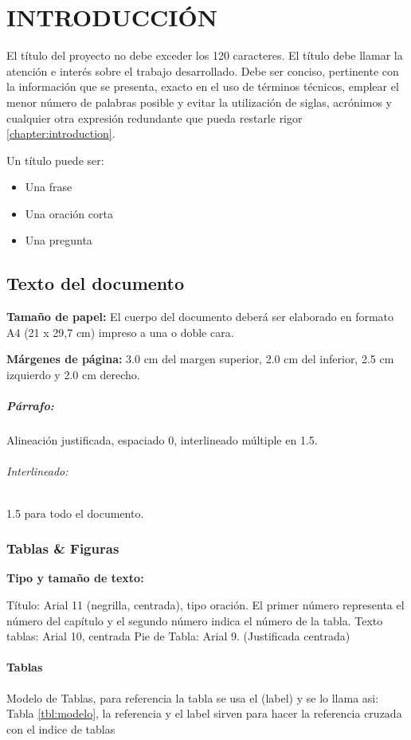 \chapter{INTRODUCCI\'ON}
\thispagestyle{empty}
\label{chapter:introduction}

El título del proyecto no debe exceder los 120 caracteres.
El título debe llamar la atención e interés sobre el trabajo desarrollado. Debe ser conciso, pertinente con la información que se presenta, exacto en el uso de términos técnicos, emplear el menor número de palabras posible y evitar la utilización de siglas, acrónimos y cualquier otra expresión redundante que pueda restarle rigor \ref{chapter:introduction}. 

Un título puede ser:
\begin{itemize}
    \item Una frase
    \item Una oración corta 
    \item Una pregunta 
\end{itemize}

\section{Texto del documento}
\textbf{Tamaño de papel:} El cuerpo del documento deberá ser elaborado en formato A4 (21 x 29,7 cm) impreso a una o doble cara.

\textbf{Márgenes de página:} 3.0 cm del margen superior, 2.0 cm del inferior, 2.5 cm izquierdo y 2.0 cm derecho.

\paragraph{Párrafo:}
Alineación justificada, espaciado 0, interlineado múltiple en 1.5.

\subparagraph{Interlineado:}
1.5 para todo el documento.

\subsection{Tablas \& Figuras}
\textbf{Tipo y tamaño de texto:}

Título: Arial 11 (negrilla, centrada), tipo oración. El primer número representa el número del capítulo y el segundo número indica el número de la tabla.
Texto tablas: Arial 10, centrada
Pie de Tabla: Arial 9. (Justificada centrada) 


\subsubsection{Tablas}
Modelo de Tablas, para referencia la tabla se usa el (label) y se lo llama asi: Tabla \ref{tbl:modelo}, la referencia y el label sirven para hacer la referencia cruzada con el indice de tablas

